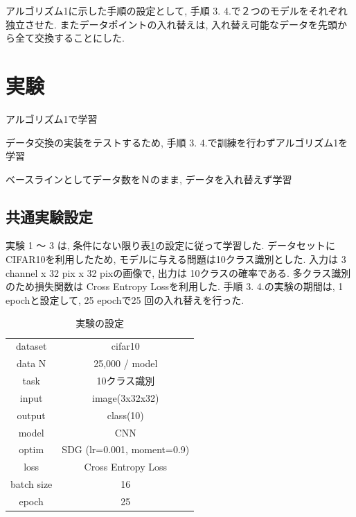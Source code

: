 \documentclass[twocolumn]{jarticle}     %
\begin{document}
	アルゴリズム1に示した手順の設定として, 手順 3. 4.で２つのモデルをそれぞれ独立させた. またデータポイントの入れ替えは, 入れ替え可能なデータを先頭から全て交換することにした.

\section{実験}

\begin{description}{ %
		\item[実験1]{アルゴリズム1で学習}
		\item[実験2]{データ交換の実装をテストするため, 手順 3. 4.で訓練を行わずアルゴリズム1を学習}
		\item[実験3]{ベースラインとしてデータ数をＮのまま, データを入れ替えず学習}
}\end{description}

\subsection{共通実験設定}

	実験 1 ～ 3 は, 条件にない限り表\ref{tab:setting}の設定に従って学習した. データセットに CIFAR10\cite{CIFAR10}を利用したため, モデルに与える問題は10クラス識別とした. 入力は 3 channel x 32 pix x 32 pixの画像で, 出力は 10クラスの確率である. 多クラス識別のため損失関数は Cross Entropy Lossを利用した.
	手順 3. 4.の実験の期間は, 1 epochと設定して, 25 epochで25 回の入れ替えを行った.

	\begin{table}[tb]
	  \begin{center}
	    \caption{実験の設定}
	    \begin{tabular}{|c|c|} \hline
				dataset & cifar10 \\
				data N & 25,000 / model \\ \hline
	      task & 10クラス識別 \\
	      input & image(3x32x32) \\
				output & class(10) \\ \hline
	      model & CNN \\
	      optim & SDG (lr=0.001, moment=0.9) \\
	      loss & Cross Entropy Loss \\ \hline
	      batch size & 16 \\
	      epoch & 25 \\ \hline
	    \end{tabular}
	    \label{tab:setting}
	  \end{center}
	\end{table}
\end{document}
